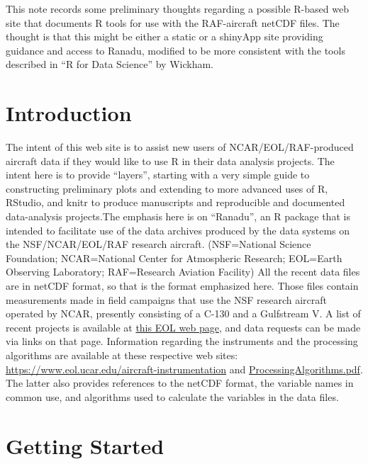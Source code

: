 \documentclass[12pt,english]{report}\usepackage[]{graphicx}\usepackage[]{color}
\begin{document}
This note records some preliminary thoughts regarding a possible R-based
web site that documents R tools for use with the RAF-aircraft netCDF
files. The thought is that this might be either a static or a shinyApp
site providing guidance and access to Ranadu, modified to be more
consistent with the tools described in ``R for Data Science'' by
Wickham.



\chapter{Introduction}

The intent of this web site is to assist new users of NCAR/EOL/RAF-produced
aircraft data if they would like to use R in their data analysis projects.
The intent here is to provide ``layers'', starting with a very simple
guide to constructing preliminary plots and extending to more advanced
uses of R, RStudio, and knitr to produce manuscripts and reproducible
and documented data-analysis projects.The emphasis here is on ``Ranadu'',
an R package that is intended to facilitate use of the data archives
produced by the data systems on the NSF/NCAR/EOL/RAF research aircraft.
(NSF=National Science Foundation; NCAR=National Center for Atmospheric
Research; EOL=Earth Observing Laboratory; RAF=Research Aviation Facility)
All the recent data files are in netCDF format, so that is the format
emphasized here. Those files contain measurements made in field campaigns
that use the NSF research aircraft operated by NCAR, presently consisting
of a C-130 and a Gulfstream V. A list of recent projects is available
at \href{http://www.eol.ucar.edu/all-field-projects-and-deployments/}{this EOL web page},
and data requests can be made via links on that page. Information
regarding the instruments and the processing algorithms are available
at these respective web sites: \href{https://www.eol.ucar.edu/aircraft-instrumentation}{https://www.eol.ucar.edu/aircraft-instrumentation}
and \href{https://github.com/NCAR/aircraft_ProcessingAlgorithms/blob/master/ProcessingAlgorithms.pdf}{ProcessingAlgorithms.pdf}.
The latter also provides references to the netCDF format, the variable
names in common use, and algorithms used to calculate the variables
in the data files.

\chapter{Getting Started}
\end{document}
